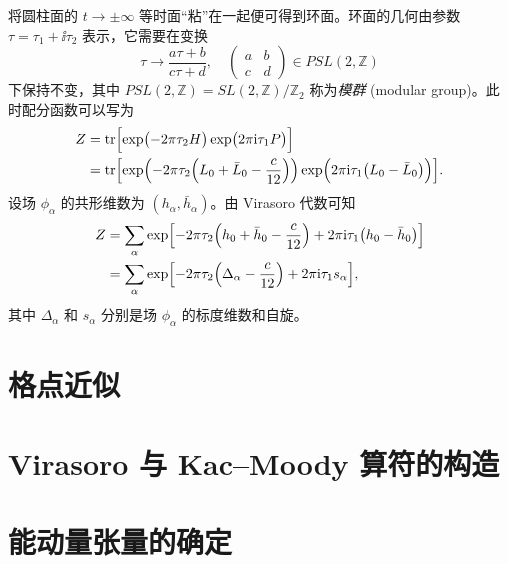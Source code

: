 将圆柱面的 $t\to\pm\infty$ 等时面“粘”在一起便可得到环面。环面的几何由参数 $\tau=\tau_1+\ii\tau_2$ 表示，它需要在变换
\begin{equation}
  \tau \to \frac{a\tau+b}{c\tau+d}, \quad \begin{pmatrix} a & b \\ c & d \end{pmatrix} \in PSL(2,\mathbb{Z})
\end{equation}
下保持不变，其中 $PSL(2,\mathbb{Z})=SL(2,\mathbb{Z})/\mathbb{Z}_2$ 称为\emph{模群} (modular group)。此时配分函数可以写为
\begin{align}
  Z &= \operatorname{tr} \Bigl[ \exp \bigl( -2\pi\tau_2 H \bigr) \exp \bigl( 2\pi{\mathrm{i}}\tau_1 P \bigr) \Bigr] \notag \\
    &= \operatorname{tr} \Bigl[
         \exp \Bigl( -2\pi   \tau_2 \Bigl( L_0 + \bar{L}_0 - \frac{c}{12} \Bigr) \Bigr)
         \exp \Bigl(  2\pi{\mathrm{i}}\tau_1 \bigl( L_0 - \bar{L}_0 \bigr) \Bigr)
       \Bigr].
\end{align}
设场 $\phi_\alpha$ 的共形维数为 $(h_\alpha,\bar{h}_\alpha)$。由 Virasoro 代数可知
\begin{align}
  Z &= \sum_\alpha \exp \Bigl[
         - 2\pi   \tau_2 \Bigl( h_0 + \bar{h}_0 - \frac{c}{12} \Bigr)
         + 2\pi{\mathrm{i}}\tau_1 \bigl( h_0 - \bar{h}_0 \bigr)
       \Bigr] \notag \\
    &= \sum_\alpha \exp \Bigl[
         - 2\pi   \tau_2 \Bigl(\Delta_\alpha - \frac{c}{12} \Bigr)
         + 2\pi{\mathrm{i}}\tau_1 s_\alpha
       \Bigr],
\end{align}
其中 $\Delta_\alpha$ 和 $s_\alpha$ 分别是场 $\phi_\alpha$ 的标度维数和自旋。

\section{格点近似}

\section{Virasoro 与 Kac--Moody 算符的构造}

\section{能动量张量的确定}
